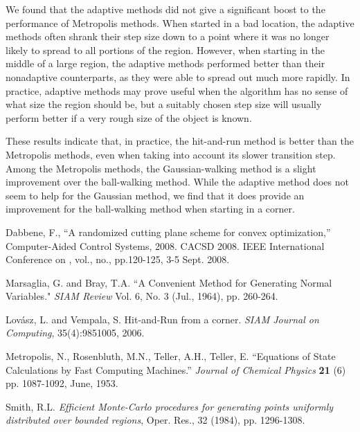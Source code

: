 \documentclass[11pt]{article}
\begin{document}
We found that the adaptive methods did not give a significant boost to the performance of Metropolis methods. When started in a bad location, the adaptive methods often shrank their step size down to a point where it was no longer likely to spread to all portions of the region. However, when starting in the middle of a large region, the adaptive methods performed better than their nonadaptive counterparts, as they were able to spread out much more rapidly. In practice, adaptive methods may prove useful when the algorithm has no sense of what size the region should be, but a suitably chosen step size will usually perform better if a very rough size of the object is known.

These results indicate that, in practice, the hit-and-run method is better than the Metropolis methods, even when taking into account its slower transition step. Among the Metropolis methods, the Gaussian-walking method is a slight improvement over the ball-walking method. While the adaptive method does not seem to help for the Gaussian method, we find that it does provide an improvement for the ball-walking method when starting in a corner.

\pagebreak

\begin{thebibliography}{9}

 Dabbene, F., ``A randomized cutting plane scheme for convex optimization,'' Computer-Aided Control Systems, 2008. CACSD 2008. IEEE International Conference on , vol., no., pp.120-125, 3-5 Sept. 2008.

 Marsaglia, G. and Bray, T.A. ``A Convenient Method for Generating Normal Variables." \emph{SIAM Review} Vol. 6, No. 3 (Jul., 1964), pp. 260-264.

 Lov\'asz, L. and Vempala, S. Hit-and-Run from a corner. \emph{SIAM Journal on Computing}, 35(4):9851005, 2006.

 Metropolis, N., Rosenbluth, M.N., Teller, A.H., Teller, E. ``Equations of State Calculations by Fast Computing Machines.'' \emph{Journal of Chemical Physics} \textbf{21} (6) pp. 1087-1092, June, 1953.

 Smith, R.L. \emph{Efficient Monte-Carlo procedures for generating points uniformly distributed over
bounded regions}, Oper. Res., 32 (1984), pp. 1296-1308.

\end{thebibliography}
\end{document}
